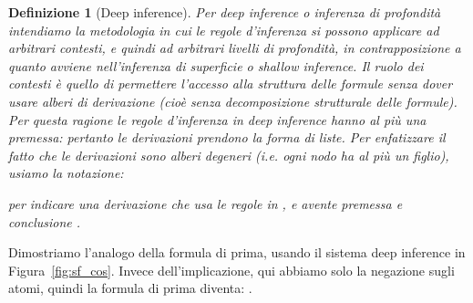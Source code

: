 \documentclass[12pt,a4paper,openright,twoside]{report}
\newtheorem{dfn}[thm]{Definizione}
\begin{document}
\begin{dfn}[Deep inference] Per \emph{deep inference} o \emph{inferenza di profondit\`a} intendiamo la metodologia in cui le regole d'inferenza si possono applicare ad arbitrari contesti, e quindi ad arbitrari livelli di profondit\`a, in contrapposizione a quanto avviene nell'inferenza di superficie o \emph{shallow inference}. Il ruolo dei contesti \`e quello di permettere l'accesso alla struttura delle formule senza dover usare alberi di derivazione (cio\`e senza decomposizione strutturale delle formule). Per questa ragione le regole d'inferenza in deep inference hanno al pi\`u una premessa: pertanto le derivazioni prendono la forma di liste. Per enfatizzare il fatto che le derivazioni sono \emph{alberi degeneri} (i.e. ogni nodo ha al pi\`u un figlio), usiamo la notazione: 

per indicare una derivazione  che usa le regole in , e avente premessa  e conclusione .
\end{dfn}

Dimostriamo l'analogo della formula di prima, usando il sistema deep inference in Figura~\ref{fig:sf_cos}. Invece dell'implicazione, qui abbiamo solo la negazione sugli atomi, quindi la formula di prima diventa: .
\end{document}
